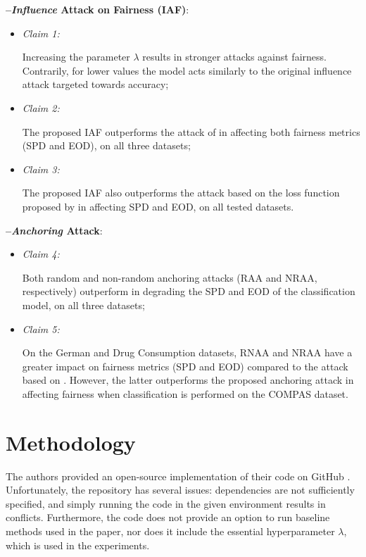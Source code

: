 \textbf{--\hspace{2mm}\textit{Influence} Attack on Fairness (IAF)}:
    \begin{itemize}
    \itemsep0.0em 
        \item \hypertarget{claim-1}{\textit{Claim 1:}} Increasing the parameter $\lambda$ results in stronger attacks against fairness. Contrarily, for lower values the model acts similarly to the original influence attack \citep{koh2018} targeted towards accuracy;
        \item \hypertarget{claim-2}{\textit{Claim 2:}} The proposed IAF outperforms the attack of  in affecting both fairness metrics (SPD and EOD), on all three datasets;
        \item \hypertarget{claim-3}{\textit{Claim 3:}} The proposed IAF also outperforms the attack based on the loss function proposed by  in affecting SPD and EOD, on all tested datasets.
    \end{itemize}
\textbf{--\hspace{2mm}\textit{Anchoring} Attack}:
    \begin{itemize}
    \itemsep0.0em 
        \item \hypertarget{claim-4}{\textit{Claim 4:}} Both random and non-random anchoring attacks (RAA and NRAA, respectively) outperform  in degrading the SPD and EOD of the classification model, on all three datasets;
        \item \hypertarget{claim-5}{\textit{Claim 5:}} On the German and Drug Consumption datasets, RNAA and NRAA have a greater impact on fairness metrics (SPD and EOD) compared to the attack based on . However, the latter outperforms the proposed anchoring attack in affecting fairness when classification is performed on the COMPAS dataset.
    \end{itemize}
\section{Methodology}
\label{sec:methodology}

The authors provided an open-source implementation of their code on GitHub \citep{original_github}. Unfortunately, the repository has several issues: dependencies are not sufficiently specified, and simply running the code in the given environment results in conflicts. Furthermore, the code does not provide an option to run baseline methods used in the paper, nor does it include the essential hyperparameter $\lambda$, which is used in the experiments. 

